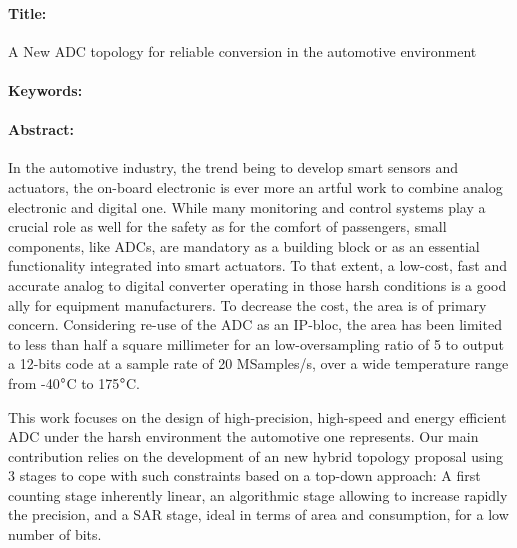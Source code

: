 \clearpage
\begin{mdframed}[linecolor=Prune,linewidth=1]
\vspace{-.25cm}
\paragraph*{Title:} A New ADC topology for reliable conversion in the automotive environment

\begin{small}
\vspace{-.25cm}
\paragraph*{Keywords:} 

\vspace{-.5cm}
\paragraph*{Abstract:} 
In the automotive industry, the trend being to develop smart sensors and actuators, the on-board electronic is ever more an artful work to combine analog electronic and digital one. While many monitoring and control systems play a crucial role as well for the safety as for the comfort of passengers, small components, like ADCs, are mandatory as a building block or as an essential functionality integrated into smart actuators. To that extent, a low-cost, fast and accurate analog to digital converter operating in those harsh conditions is a good ally for equipment manufacturers. To decrease the cost, the area is of primary concern. Considering re-use of the ADC as an IP-bloc, the area has been limited to less than half a square millimeter for an low-oversampling ratio of 5 to output a 12-bits code at a sample rate of 20 MSamples/s, over a wide temperature range from -40\(\degree \)C to 175\(\degree \)C.

This work focuses on the design of high-precision, high-speed and energy efficient ADC under the harsh environment the automotive one represents. Our main contribution relies on the development of an new hybrid topology proposal using 3 stages to cope with such constraints based on a top-down approach: A first counting stage inherently linear, an algorithmic stage allowing to increase rapidly the precision, and a SAR stage, ideal in terms of area and consumption, for a low number of bits.


\end{small}
\end{mdframed}
